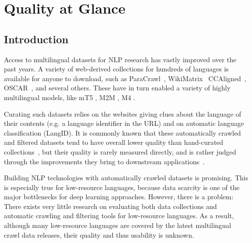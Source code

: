 \chapter{Quality at Glance}

\section{Introduction}
Access to multilingual datasets for NLP research has vastly improved over the past years. A variety of web-derived collections for hundreds of languages is available for anyone to download, such as ParaCrawl~\citep{espla-etal-2019-paracrawl, banon-etal-2020-paracrawl}, WikiMatrix~\citep{schwenk-etal-2021-wikimatrix} CCAligned~\citep{el-kishky-etal-2020-ccaligned}, \mbox{OSCAR}~\citep{ortiz-suarez-etal-2019-asynchronous, ortiz-suarez-etal-2020-monolingual}, and several others.
These have in turn enabled a variety of highly multilingual models, like mT5 \citep{xue-etal-2021-mt5}, M2M \citep{fan-etal-2020-beyond}, M4 \citep{arivazhagan-etal-2019-massively}.

Curating such datasets relies on the websites giving clues about the language of their contents (e.g. a language identifier in the URL) and on automatic language classification (LangID).
It is commonly known that these automatically crawled and filtered datasets tend to have overall lower quality than hand-curated collections~\citep{koehn-etal-2020-findings}, but their quality is rarely measured directly, and is rather judged through the improvements they bring to downstream applications~\citep{schwenk-etal-2021-wikimatrix}.

Building NLP technologies with automatically crawled datasets is promising. This is especially true for low-resource languages, because data scarcity is one of the major bottlenecks for deep learning approaches.
However, there is a problem: There exists very little research on evaluating both data collections and automatic crawling and filtering tools for low-resource languages.
As a result, although many low-resource languages are covered by the latest multilingual crawl data releases, their quality and thus usability is unknown. %

